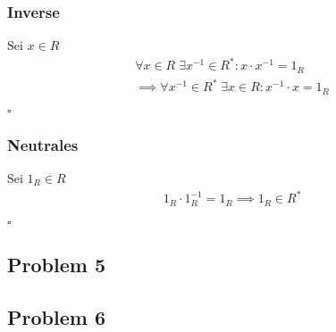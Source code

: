 \documentclass[12pt, german]{article}
\newcommand{\bewiesen}{\begin{flushright}$\square$ \end{flushright} }
\begin{document}
    	\subsubsection*{Inverse}
    	Sei $x \in R$ 
    		\begin{align*} 
    		 \forall  x \in R \; \exists x^{-1} \in R^\ast : x\cdot x^{-1} = 1_R  \\
    		 \implies \forall x^{-1} \in R^\ast \; \exists x \in R : x^{-1} \cdot x = 1_R
    	\end{align*} \bewiesen
    	
    	\subsubsection*{Neutrales}
    		Sei $1_R \in R$ 
    		\begin{align*}
    			1_R \cdot 1_R^{-1} = 1_R \implies 1_R \in R^\ast
    	\end{align*} \bewiesen
 
    \subsection*{Problem 5}
    \subsection*{Problem 6}
    		
    
    
    
\end{document}
